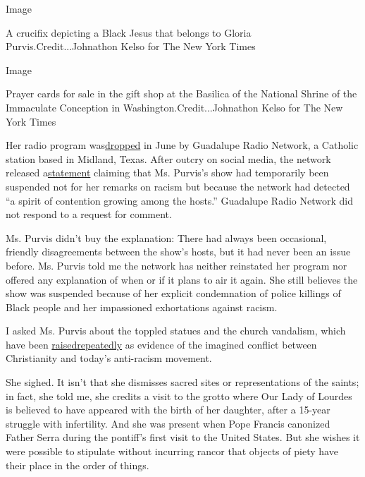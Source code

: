 Image

A crucifix depicting a Black Jesus that belongs to Gloria
Purvis.Credit...Johnathon Kelso for The New York Times

Image

Prayer cards for sale in the gift shop at the Basilica of the National
Shrine of the Immaculate Conception in Washington.Credit...Johnathon
Kelso for The New York Times

Her radio program
was\href{https://osvnews.com/2020/06/26/ewtns-largest-radio-affiliate-drops-morning-glory-as-host-gloria-purvis-continues-to-speak-out-about-racism/}{dropped}
in June by Guadalupe Radio Network, a Catholic station based in Midland,
Texas. After outcry on social media, the network released
a\href{https://www.grnonline.com/en/events/southeast}{statement}
claiming that Ms. Purvis's show had temporarily been suspended not for
her remarks on racism but because the network had detected ``a spirit of
contention growing among the hosts.'' Guadalupe Radio Network did not
respond to a request for comment.

Ms. Purvis didn't buy the explanation: There had always been occasional,
friendly disagreements between the show's hosts, but it had never been
an issue before. Ms. Purvis told me the network has neither reinstated
her program nor offered any explanation of when or if it plans to air it
again. She still believes the show was suspended because of her explicit
condemnation of police killings of Black people and her impassioned
exhortations against racism.

I asked Ms. Purvis about the toppled statues and the church vandalism,
which have been
\href{https://newdailycompass.com/en/the-senseless-hatred-of-st-junipero-serra}{raised}\href{https://www.washingtontimes.com/news/2020/jul/15/black-lives-matter-protesters-turn-rage-churches-r/}{repeatedly}
as evidence of the imagined conflict between Christianity and today's
anti-racism movement.

She sighed. It isn't that she dismisses sacred sites or representations
of the saints; in fact, she told me, she credits a visit to the grotto
where Our Lady of Lourdes is believed to have appeared with the birth of
her daughter, after a 15-year struggle with infertility. And she was
present when Pope Francis canonized Father Serra during the pontiff's
first visit to the United States. But she wishes it were possible to
stipulate without incurring rancor that objects of piety have their
place in the order of things.

